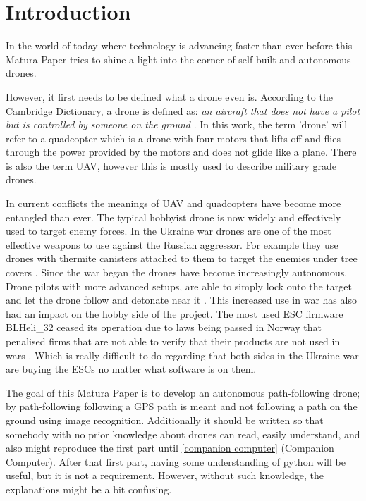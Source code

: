 \documentclass[svgnames]{article}
\begin{document}
\maketitle
\newpage
\tableofcontents
\newpage
	\section{Introduction}
	
	In the world of today where technology is advancing faster than ever before this Matura Paper tries to shine a light into the corner of self-built and autonomous drones.
	
	However, it first needs to be defined what a drone even is. According to the Cambridge Dictionary, a drone is defined as: \textit{an aircraft that does not have a pilot but is controlled by someone on the ground} \cite{cambridgedrone}. In this work, the term 'drone' will refer to a quadcopter which is a drone with four motors that lifts off and flies through the power provided by the motors and does not glide like a plane. There is also the term \gls{UAV}, however this is mostly used to describe military grade drones.

	In current conflicts the meanings of \gls{UAV} and quadcopters have become more entangled than ever. The typical hobbyist drone is now widely and effectively used to target enemy forces. In the Ukraine war drones are one of the most effective weapons to use against the Russian aggressor. For example they use drones with thermite canisters attached to them to target the enemies under tree covers \cite{thermitedrones}. Since the war began the drones have become increasingly autonomous. Drone pilots with more advanced setups, are able to simply lock onto the target and let the drone follow and detonate near it \cite{nytimesaidrones}. This increased use in war has also had an impact on the hobby side of the project. The most used \gls{ESC} firmware BLHeli\_32 ceased its operation due to laws being passed in Norway that penalised firms that are not able to verify that their products are not used in wars \cite{blhelidead}. Which is really difficult to do regarding that both sides in the Ukraine war are buying the \glspl{ESC} no matter what software is on them.  
	
	The goal of this Matura Paper is to develop an autonomous path-following drone; by path-following following a \gls{GPS} path is meant and not following a path on the ground using image recognition. Additionally it should be written so that somebody with no prior knowledge about drones can read, easily understand, and also might reproduce the first part until \cref{companion computer} (Companion Computer). After that first part, having some understanding of python will be useful, but it is not a requirement. However, without such knowledge, the explanations might be a bit confusing.
\end{document}
